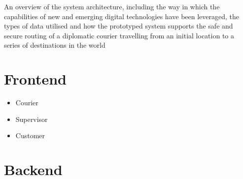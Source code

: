 An overview of the system architecture, including the way in which the capabilities of new and emerging digital technologies have been leveraged, the types of data utilised and how the prototyped system supports the safe and secure routing of a diplomatic courier travelling from an initial location to a series of destinations in the world 

\section{Frontend}
\begin{itemize}
    \item Courier
    \item Supervisor
    \item Customer
\end{itemize}

\section{Backend}
